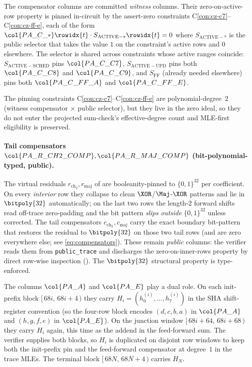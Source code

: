 \begin{remark}
The compensator columns are committed \emph{witness} columns. Their
zero-on-active-row property is pinned in-circuit by the assert-zero
constraints C\ref{con:cz-c7}--C\ref{con:cz-ff-e}, each of the form
$\col{PA\_C\_*}\rowidx{t} \cdot S_{\mathrm{ACTIVE-*}}\rowidx{t} = 0$
where $S_{\mathrm{ACTIVE-*}}$ is the public selector that takes the
value $1$ on the constraint's active rows and $0$ elsewhere. The
selector is shared across constraints whose active ranges coincide:
$S_{\mathrm{ACTIVE-SCHED}}$ pins $\col{PA\_C\_C7}$,
$S_{\mathrm{ACTIVE-UPD}}$ pins both $\col{PA\_C\_C8}$ and
$\col{PA\_C\_C9}$, and $S_{\mathrm{FF}}$ (already needed elsewhere)
pins both $\col{PA\_C\_FF\_A}$ and $\col{PA\_C\_FF\_E}$.

The pinning constraints C\ref{con:cz-c7}--C\ref{con:cz-ff-e} are
polynomial-degree~$2$ (witness compensator $\times$ public selector),
but they live in the zero ideal, so they do not enter the projected
sum-check's effective-degree count and MLE-first eligibility is
preserved.

\paragraph{Tail compensators
$\col{PA\_R\_CH2\_COMP}, \col{PA\_R\_MAJ\_COMP}$ (bit-polynomial-typed, public).}
The virtual residuals
$r_{\mathrm{ch}_2}, r_{\mathrm{maj}}$ of  are
booleanity-pinned to $\{0,1\}^{32}$ per coefficient. On every
\emph{interior} row they collapse to clean
$\XOR$/$\Maj$-$\XOR$ patterns and lie in $\bitpoly{32}$
automatically; on the last two rows the length-$2$ forward shifts
read off-trace zero-padding and the bit pattern \emph{slips outside}
$\{0,1\}^{32}$ unless corrected. The tail compensators
$c_{\mathrm{ch}_2}, c_{\mathrm{maj}}$ carry the exact boundary
bit-pattern that restores the residual to $\bitpoly{32}$ on those
two tail rows (and are zero everywhere else; see \eqref{eq:compensators}).
These remain \emph{public} columns: the verifier reads them from
\texttt{public\_trace} and discharges the zero-on-inner-rows property
by direct row-wise inspection (). The
$\bitpoly{32}$ structural property is type-enforced.
\end{remark}

\begin{remark}
\label{rem:boundaries}
The columns $\col{PA\_A}$ and $\col{PA\_E}$ play a dual role.
On each init-prefix block
$[\,68i,\,68i+4\,)$ they carry $H_i = (h_0^{(i)},\dots,h_7^{(i)})$
in the SHA shift-register convention (so the four-row block encodes
$(d,c,b,a)$ in $\col{PA\_A}$ and $(h,g,f,e)$ in $\col{PA\_E}$). On the
junction window $[\,68i+64,\,68i+68\,)$ they carry $H_i$ again, this
time as the addend in the feed-forward sum. The verifier supplies both
blocks, so $H_i$ is duplicated on disjoint row windows to keep both the
init-prefix pin and the feed-forward compensator at degree~$1$ in the
trace MLEs. The terminal block $[\,68N,\,68N+4\,)$ carries $H_N$.
\end{remark}

